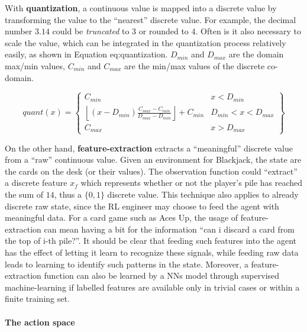 With \textbf{quantization}, a continuous value is mapped into a discrete value by transforming the value to the ``nearest'' discrete value. For example, the decimal number $3.14$ could be \textit{truncated} to $3$ or rounded to $4$. Often is it also necessary to scale the value, which can be integrated in the quantization process relatively easily, as shown in Equation {eq:quantization}. $D_{min}$ and $D_{max}$ are the domain max/min values, $C_{min}$ and $C_{max}$ are the min/max values of the discrete co-domain.

\begin{equation}
  \label{eq:quantization}
  quant(x) = \left\{
  \begin{array}{cl}
  C_{min} & x < D_{min} \\
  \left\lfloor (x - D_{min}) \frac{C_{max} - C_{min}} {D_{max} - D_{min}} \right\rfloor + C_{min} & D_{min} < x < D_{max} \\
  C_{max} & x > D_{max}
  \end{array}
  \right\}
\end{equation}

      On the other hand, \textbf{feature-extraction} extracts a ``meaningful'' discrete value from a ``raw'' continuous value. Given an environment for Blackjack, the state are the cards on the desk (or their values). The observation function could ``extract'' a discrete feature $x_f$ which represents whether or not the player's pile has reached the sum of $14$, thus a $\{0,1\}$ discrete value. This technique also applies to already discrete raw state, since the RL engineer may choose to feed the agent with meaningful data. For a card game such as Aces Up, the usage of feature-extraction can mean having a bit for the information ``can i discard a card from the top of i-th pile?''. It should be clear that feeding such features into the agent has the effect of letting it learn to recognize these signals, while feeding raw data leads to learning to identify such patterns in the state. Moreover, a feature-extraction function can also be learned by a NNs model through supervised machine-learning if labelled features are available only in trivial cases or within a finite training set.

\paragraph{The action space}

